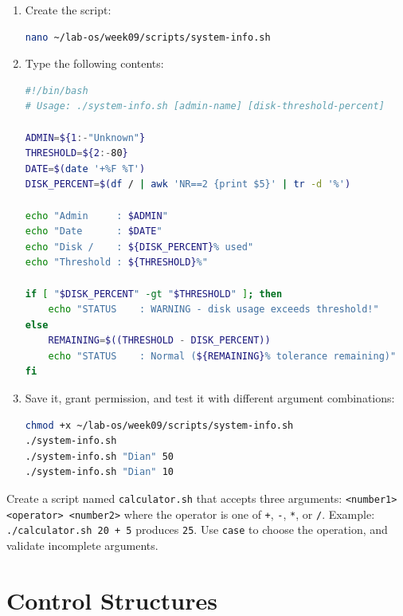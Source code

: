 \begin{enumerate}
  \item Create the script:
\begin{lstlisting}[language=bash, caption={Creating system-info.sh}]
nano ~/lab-os/week09/scripts/system-info.sh
\end{lstlisting}

  \item Type the following contents:
\begin{lstlisting}[language=bash, caption={Contents of system-info.sh}]
#!/bin/bash
# Usage: ./system-info.sh [admin-name] [disk-threshold-percent]

ADMIN=${1:-"Unknown"}
THRESHOLD=${2:-80}
DATE=$(date '+%F %T')
DISK_PERCENT=$(df / | awk 'NR==2 {print $5}' | tr -d '%')

echo "Admin     : $ADMIN"
echo "Date      : $DATE"
echo "Disk /    : ${DISK_PERCENT}% used"
echo "Threshold : ${THRESHOLD}%"

if [ "$DISK_PERCENT" -gt "$THRESHOLD" ]; then
    echo "STATUS    : WARNING - disk usage exceeds threshold!"
else
    REMAINING=$((THRESHOLD - DISK_PERCENT))
    echo "STATUS    : Normal (${REMAINING}% tolerance remaining)"
fi
\end{lstlisting}

  \item Save it, grant permission, and test it with different argument
    combinations:
\begin{lstlisting}[language=bash, caption={Testing the script}]
chmod +x ~/lab-os/week09/scripts/system-info.sh
./system-info.sh
./system-info.sh "Dian" 50
./system-info.sh "Dian" 10
\end{lstlisting}
\end{enumerate}

\begin{exercisebox}[Exercise 9.2]
Create a script named \texttt{calculator.sh} that accepts three arguments:
\texttt{<number1> <operator> <number2>} where the operator is one of
\texttt{+}, \texttt{-}, \texttt{*}, or \texttt{/}. Example:
\texttt{./calculator.sh 20 + 5} produces \texttt{25}. Use \texttt{case} to
choose the operation, and validate incomplete arguments.
\end{exercisebox}

\section{Control Structures}
\label{sec:control-structures}

